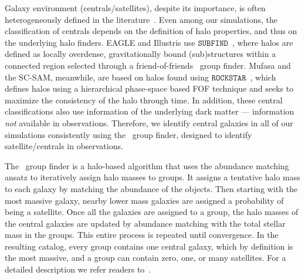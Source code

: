 \documentclass[preprint2,tighten]{aastex62}
\begin{document}
Galaxy environment (centrals/satellites), despite its importance, 
is often heterogeneously defined in the literature~\cite{muldrew2012}. 
Even among our simulations, the classification of centrals depends on 
the definition of halo properties, and thus on the underlying halo 
finders. EAGLE and Illustris use $\mathtt{SUBFIND}$~\citep{springel2001},
where halos are defined as locally overdense, gravitationally bound
(sub)structures within a connected region selected through a 
friend-of-friends~\citep[FOF;][]{davis1985} group finder. {\sc Mufasa} 
and the SC-SAM, meanwhile, are based on halos found using 
$\mathtt{ROCKSTAR}$~\citep{behroozi2013}, which defines halos using a
hierarchical phase-space based FOF technique and seeks to maximize 
the consistency of the halo through time. In addition, these central 
classifications also use information of the underlying dark 
matter --- information {\em not} available in observations. Therefore, 
we identify central galaxies in all of our simulations consistently 
using %
the~\cite{tinker2011} group finder, 
designed to identify satellite/centrals in observations. 

The~\cite{tinker2011} group finder is a halo-based algorithm that uses 
the abundance matching ansatz to iteratively assign halo masses to groups. 
It assigns a tentative halo mass to each galaxy by matching the abundance 
of the objects. Then starting with the most massive galaxy, nearby lower
mass galaxies are assigned a probability of being a satellite. Once all 
the galaxies are assigned to a group, the halo masses of the central galaxies 
are updated by abundance matching with the total stellar mass in the groups. 
This entire process is repeated until convergence. In the resulting catalog, 
every group contains one central galaxy, which by definition is the 
most massive, and a group can contain zero, one, or many satellites.
For a detailed description we refer readers to~\cite{tinker2011,wetzel2012}. 
\end{document}

